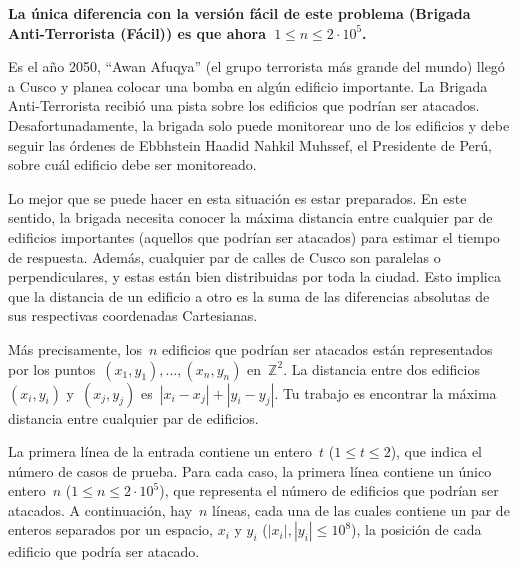 
\textbf{La única diferencia con la versión fácil de este problema (Brigada
  Anti-Terrorista (Fácil)) es que ahora~$1 \leq n \leq 2 \cdot 10^5$.}

Es el año 2050, ``Awan Afuqya'' (el grupo terrorista más grande del mundo) llegó a
Cusco y planea colocar una bomba en algún edificio importante. La Brigada
Anti-Terrorista recibió una pista sobre los edificios que podrían ser
atacados. Desafortunadamente, la brigada solo puede monitorear uno de los edificios y
debe seguir las órdenes de Ebbhstein Haadid Nahkil Muhssef, el Presidente de Perú,
sobre cuál edificio debe ser monitoreado.

Lo mejor que se puede hacer en esta situación es estar preparados. En este sentido,
la brigada necesita conocer la máxima distancia entre cualquier par de edificios
importantes (aquellos que podrían ser atacados) para estimar el tiempo de
respuesta. Además, cualquier par de calles de Cusco son paralelas o perpendiculares,
y estas están bien distribuidas por toda la ciudad. Esto implica que la distancia de
un edificio a otro es la suma de las diferencias absolutas de sus respectivas
coordenadas Cartesianas.

Más precisamente, los~$n$ edificios que podrían ser atacados están representados por
los puntos~$(x_1, y_1), \dots, (x_n, y_n)$ en~$\mathbb{Z}^2$. La distancia entre dos
edificios~$(x_i, y_i)$ y~$(x_j, y_j)$ es~$|x_i - x_j| + |y_i - y_j|$. Tu trabajo es
encontrar la máxima distancia entre cualquier par de edificios.



La primera línea de la entrada contiene un entero~$t$ ($1 \leq t \leq 2$), que indica
el número de casos de prueba. Para cada caso, la primera línea contiene un único
entero~$n$ ($1 \leq n \leq 2 \cdot 10^5$), que representa el número de edificios que
podrían ser atacados. A continuación, hay~$n$ líneas, cada una de las cuales contiene
un par de enteros separados por un espacio, $x_i$ y $y_i$ ($|x_i|, |y_i| \leq 10^8$),
la posición de cada edificio que podría ser atacado.

\outputText


